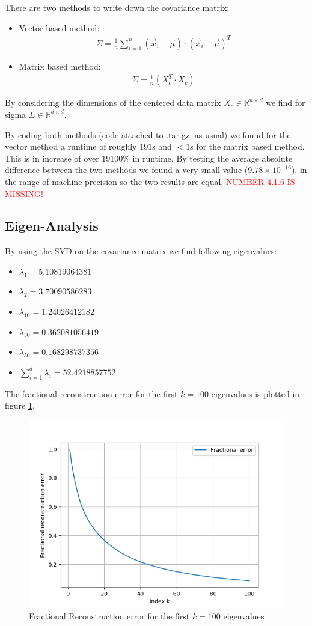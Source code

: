 \documentclass[12pt]{article}
\begin{document}
There are two methods to write down the covariance matrix:
\begin{itemize}
	\item Vector based method:
	\begin{align}
	\Sigma = \frac{1}{n}\sum_{i = 1}^{n} (\vec{x}_i - \vec{\mu})\cdot (\vec{x}_i - \vec{\mu})^T
	\end{align}
	\item Matrix based method:
	\begin{align}
	\Sigma = \frac{1}{n} (X_c^T\cdot X_c)
	\end{align}
\end{itemize}
By considering the dimensions of the centered data matrix $X_c \in \mathbb{R}^{n\times d}$ we find for sigma $\Sigma \in \mathbb{R}^{d\times d}$. \par 
By coding both methods (code attached to .tar.gz, as usual) we found for the vector method a runtime of roughly $191\text{s}$ and $<1$s for the matrix based method. This is in increase of over $19100\%$ in runtime. By testing the average absolute difference between the two methods we found a very small value ($9.78\times 10^{-16}$), in the range of machine precision so the two results are equal.
\textcolor{red}{NUMBER 4.1.6 IS MISSING!}

\subsection{Eigen-Analysis}

By using the SVD on the covariance matrix we find following eigenvalues:
\begin{itemize}
	\item $\lambda_1 = 5.10819064381$
	\item $\lambda_2 = 3.70090586283$
	\item $\lambda_{10} = 1.24026412182$
	\item $\lambda_{30} = 0.362081056419$
	\item $\lambda_{50} = 0.168298737356$
	\item $\sum_{i=1}^{d} \lambda_i = 52.4218857752$
\end{itemize}

The fractional reconstruction error for the first $k=100$ eigenvalues is plotted in figure \ref{fig:4.2.2}.

\begin{figure}
	\centering
	\includegraphics[width=0.66\linewidth]{../Problem_4/Problem_4.2.2.png}
	\caption{Fractional Reconstruction error for the first $k=100$ eigenvalues}
	\label{fig:4.2.2}
\end{figure}
\end{document}
